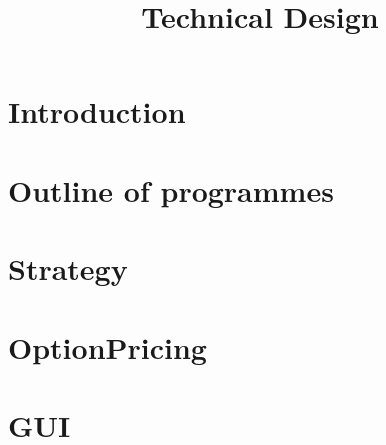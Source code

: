 \documentclass[12pt,a4paper,titlepage]{article}
\title {Technical Design}
\begin{document}
\maketitle
\listoftables
\tableofcontents
\section{Introduction}


\section{Outline of programmes}

\section{\FeedName}

\section{\AnalyisName}

\section{Strategy}
\section{OptionPricing}
\section{GUI}
%
\end{document}
